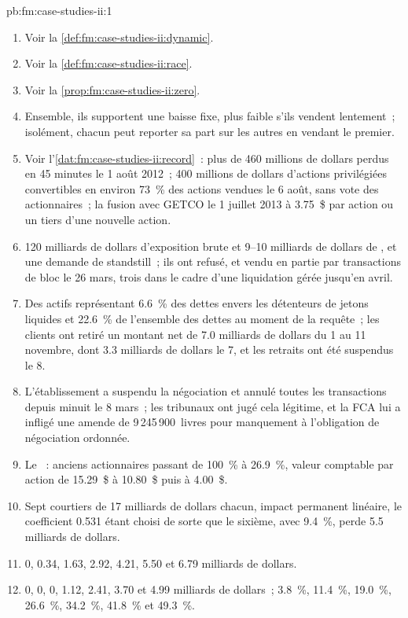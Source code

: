 \begin{solution}{pb:fm:case-studies-ii:1}
\begin{enumerate}
\item Voir la \cref{def:fm:case-studies-ii:dynamic}.
\item Voir la \cref{def:fm:case-studies-ii:race}.
\item Voir la \cref{prop:fm:case-studies-ii:zero}.
\item Ensemble, ils supportent une baisse fixe, plus faible s'ils vendent lentement~; isolément, chacun peut reporter sa part sur les autres en vendant le premier.
\item Voir l'\cref{dat:fm:case-studies-ii:record}~: plus de 460 millions de dollars perdus en 45 minutes le 1 août 2012~; 400 millions de dollars d'actions privilégiées convertibles
en environ 73~\% des actions vendues le 6 août, sans vote des actionnaires~; la fusion avec GETCO le 1 juillet 2013 à 3.75~\$ par action ou un tiers
d'une nouvelle action.
\item 120 milliards de dollars d'exposition brute et 9--10 milliards de dollars de , et une demande de standstill~; ils ont refusé, et vendu en partie par transactions de bloc le 26
mars, trois dans le cadre d'une liquidation gérée jusqu'en avril.
\item Des actifs représentant 6.6~\% des dettes envers les détenteurs de jetons liquides et 22.6~\% de l'ensemble des dettes au moment de la requête~; les clients ont retiré un montant net de 7.0 milliards de dollars du 1 au 11
novembre, dont 3.3 milliards de dollars le 7, et les retraits ont été suspendus le 8.
\item L'établissement a suspendu la négociation et annulé toutes les transactions depuis minuit le 8 mars~; les tribunaux ont jugé cela légitime, et la FCA lui a infligé une amende de
9\,245\,900~livres pour manquement à l'obligation de négociation ordonnée.
\item Le ~: anciens actionnaires passant de 100~\% à 26.9~\%, valeur comptable par action de 15.29~\$ à 10.80~\$ puis à 4.00~\$.
\item Sept courtiers de 17 milliards de dollars chacun, impact permanent linéaire, le coefficient 0.531 étant choisi de sorte que le sixième, avec 9.4~\%, perde 5.5 milliards de dollars.
\item 0, 0.34, 1.63, 2.92, 4.21, 5.50 et 6.79 milliards de dollars.
\item 0, 0, 0, 1.12, 2.41, 3.70 et 4.99 milliards de dollars~; 3.8~\%, 11.4~\%, 19.0~\%, 26.6~\%, 34.2~\%, 41.8~\% et 49.3~\%.

\end{enumerate}
\end{solution}
